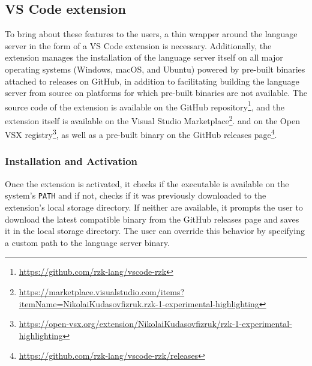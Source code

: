 \subsection{VS Code extension}

To bring about these features to the users, a thin wrapper around the language server in the form of a VS Code extension is necessary.
Additionally, the extension manages the installation of the language server itself on all major operating systems (Windows, macOS, and Ubuntu)
powered by pre-built binaries attached to releases on GitHub,
in addition to facilitating building the language server from source on platforms
for which pre-built binaries are not available.
The source code of the extension is available on the GitHub repository\footnote{
  \url{https://github.com/rzk-lang/vscode-rzk}},
and the extension itself is available on the Visual Studio Marketplace\footnote{
  \url{https://marketplace.visualstudio.com/items?itemName=NikolaiKudasovfizruk.rzk-1-experimental-highlighting}}.
and on the Open VSX registry\footnote{
  \url{https://open-vsx.org/extension/NikolaiKudasovfizruk/rzk-1-experimental-highlighting}},
as well as a pre-built binary on the GitHub releases page\footnote{
  \url{https://github.com/rzk-lang/vscode-rzk/releases}}.

\subsubsection{Installation and Activation}

Once the extension is activated, it checks if the \Rzk{} executable is available on the system's
\texttt{PATH} and if not, checks if it was previously downloaded to the extension's local storage directory.
If neither are available, it prompts the user to download the latest compatible binary from the GitHub
releases page and saves it in the local storage directory.
The user can override this behavior by specifying a custom path to the language server binary.

